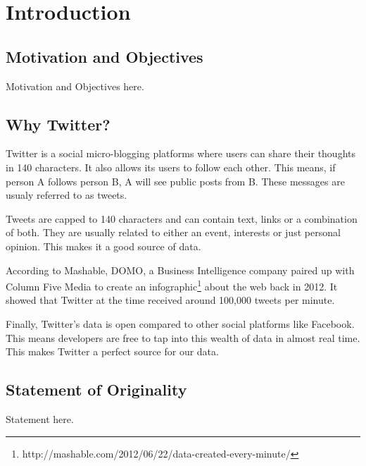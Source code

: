 
\chapter{Introduction}

\section{Motivation and Objectives}

Motivation and Objectives here.


\section{Why Twitter?}
Twitter is a social micro-blogging platforms where users can share their thoughts in 140 characters.
It also allows its users to follow each other. This means, if person A follows person B, A will see
public posts from B. These messages are usualy referred to as tweets.

Tweets are capped to 140 characters and can contain text, links or a combination of both. They are
usually related to either an event, interests or just personal opinion. This makes it a good source
of data.

According to Mashable, DOMO, a Business Intelligence company paired up with Column Five Media to
create an infographic\footnote{http://mashable.com/2012/06/22/data-created-every-minute/} about the
web back in 2012. It showed that Twitter at the time received around 100,000 tweets per minute.

Finally, Twitter's data is open compared to other social platforms like Facebook. This means
developers are free to tap into this wealth of data in almost real time. This makes Twitter a
perfect source for our data.


\section{Statement of Originality}

Statement here.


